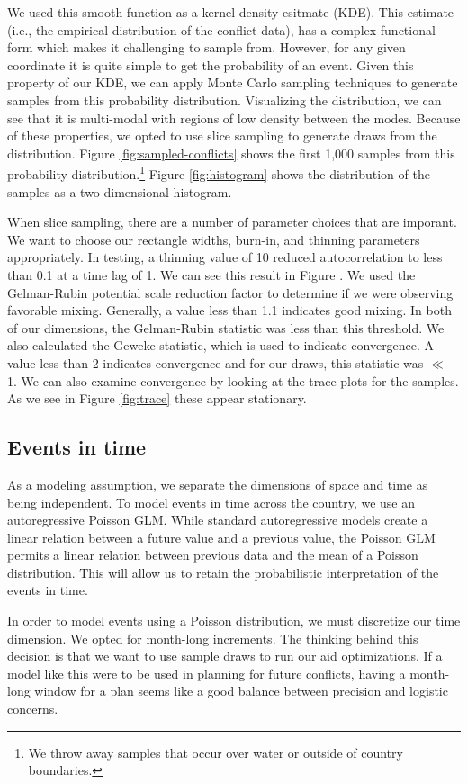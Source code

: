 \documentclass{article} %
\begin{document}
We used this smooth function as a kernel-density esitmate (KDE). This estimate (i.e., the empirical distribution of the conflict data), has a complex functional form which makes it challenging to sample from. However, for any given coordinate it is quite simple to get the probability of an event. Given this property of our KDE, we can apply Monte Carlo sampling techniques to generate samples from this probability distribution. Visualizing the distribution, we can see that it is multi-modal with regions of low density between the modes. Because of these properties, we opted to use slice sampling to generate draws from the distribution. Figure \ref{fig:sampled-conflicts} shows the first 1,000 samples from this probability distribution.\footnote{We throw away samples that occur over water or outside of country boundaries.} Figure \ref{fig:histogram} shows the distribution of the samples as a two-dimensional histogram.

When slice sampling, there are a number of parameter choices that are imporant. We want to choose our rectangle widths, burn-in, and thinning parameters appropriately. In testing, a thinning value of 10 reduced autocorrelation to less than 0.1 at a time lag of 1. We can see this result in Figure . We used the Gelman-Rubin potential scale reduction factor\cite{Gelman-Rubin} to determine if we were observing favorable mixing. Generally, a value less than 1.1 indicates good mixing. In both of our dimensions, the Gelman-Rubin statistic was less than this threshold. We also calculated the Geweke statistic, which is used to indicate convergence. A value less than 2 indicates convergence and for our draws, this statistic was $\ll$ 1. We can also examine convergence by looking at the trace plots for the samples. As we see in Figure \ref{fig:trace} these appear stationary.

\subsection{Events in time}
As a modeling assumption, we separate the dimensions of space and time as being independent. To model events in time across the country, we use an autoregressive Poisson GLM. While standard autoregressive models create a linear relation between a future value and a previous value, the Poisson GLM permits a linear relation between previous data and the mean of a Poisson distribution. This will allow us to retain the probabilistic interpretation of the events in time.

In order to model events using a Poisson distribution, we must discretize our time dimension. We opted for month-long increments. The thinking behind this decision is that we want to use sample draws to run our aid optimizations. If a model like this were to be used in planning for future conflicts, having a month-long window for a plan seems like a good balance between precision and logistic concerns.
\end{document}
